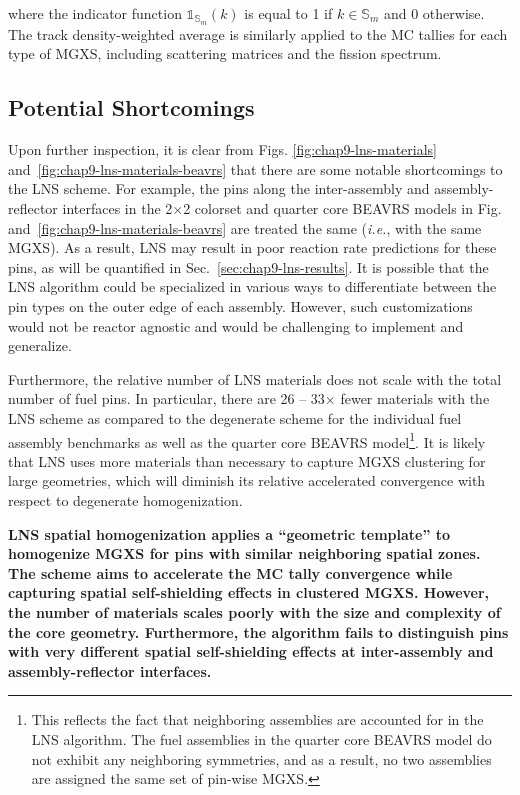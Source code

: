\noindent where the indicator function $\mathbb{1}_{\mathbb{S}_{m}}(k)$ is equal to 1 if $k \in \mathbb{S}_{m}$ and 0 otherwise. The track density-weighted average is similarly applied to the \ac{MC} tallies for each type of \ac{MGXS}, including scattering matrices and the fission spectrum.

\subsection{Potential Shortcomings}
\label{subsec:chap9-lns-shortcomings}

Upon further inspection, it is clear from Figs. \ref{fig:chap9-lns-materials} and~\ref{fig:chap9-lns-materials-beavrs} that there are some notable shortcomings to the \ac{LNS} scheme. For example, the pins along the inter-assembly and assembly-reflector interfaces in the 2$\times$2 colorset and quarter core \ac{BEAVRS} models in Fig.~ and~\ref{fig:chap9-lns-materials-beavrs} are treated the same (\textit{i.e.}, with the same \ac{MGXS}). As a result, \ac{LNS} may result in poor reaction rate predictions for these pins, as will be quantified in Sec.~\ref{sec:chap9-lns-results}. It is possible that the \ac{LNS} algorithm could be specialized in various ways to differentiate between the pin types on the outer edge of each assembly. However, such customizations would not be reactor agnostic and would be challenging to implement and generalize.

Furthermore, the relative number of \ac{LNS} materials does not scale with the total number of fuel pins. In particular, there are 26 -- 33$\times$ fewer materials with the \ac{LNS} scheme as compared to the degenerate scheme for the individual fuel assembly benchmarks as well as the quarter core \ac{BEAVRS} model\footnote{This reflects the fact that neighboring assemblies are accounted for in the \ac{LNS} algorithm. The fuel assemblies in the quarter core \ac{BEAVRS} model do not exhibit any neighboring symmetries, and as a result, no two assemblies are assigned the same set of pin-wise \ac{MGXS}.}. It is likely that \ac{LNS} uses more materials than necessary to capture \ac{MGXS} clustering for large geometries, which will diminish its relative accelerated convergence with respect to degenerate homogenization.

\begin{emphbox}
\textbf{\ac{LNS} spatial homogenization applies a ``geometric template'' to homogenize \ac{MGXS} for pins with similar neighboring spatial zones. The scheme aims to accelerate the \ac{MC} tally convergence while capturing spatial self-shielding effects in clustered \ac{MGXS}. However, the number of materials scales poorly with the size and complexity of the core geometry. Furthermore, the algorithm fails to distinguish pins with very different spatial self-shielding effects at inter-assembly and assembly-reflector interfaces.}
\end{emphbox}


